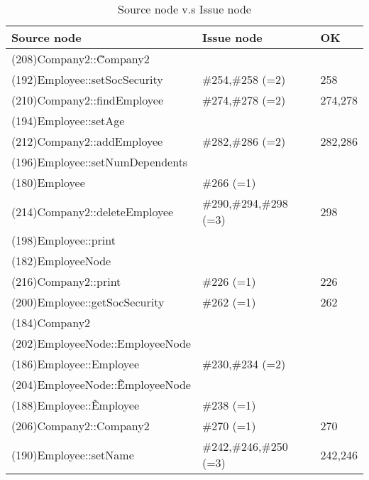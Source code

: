 \begin{table}[hb]
\begin{center}
\begin{tabular}{|l|l|l|}
\hline
Source node & Issue node  & OK\\
\hline
(208)Company2::\~Company2 &  & \\
(192)Employee::setSocSecurity & \#254,\#258 (=2) & 258\\
(210)Company2::findEmployee & \#274,\#278 (=2) & 274,278\\
(194)Employee::setAge &  & \\
(212)Company2::addEmployee & \#282,\#286 (=2) & 282,286\\
(196)Employee::setNumDependents &  & \\
(180)Employee & \#266 (=1) & \\
(214)Company2::deleteEmployee & \#290,\#294,\#298 (=3) & 298\\
(198)Employee::print &  & \\
(182)EmployeeNode &  & \\
(216)Company2::print & \#226 (=1) & 226 \\
(200)Employee::getSocSecurity & \#262 (=1) & 262\\
(184)Company2 &  & \\
(202)EmployeeNode::EmployeeNode &  & \\
(186)Employee::Employee & \#230,\#234 (=2) & \\
(204)EmployeeNode::\~EmployeeNode &  & \\
(188)Employee::\~Employee & \#238 (=1) & \\
(206)Company2::Company2 & \#270 (=1) & 270\\
(190)Employee::setName & \#242,\#246,\#250 (=3) & 242,246\\
\hline
\end{tabular}
\caption{Source node v.s Issue node}
\end{center}
\end{table}

%
